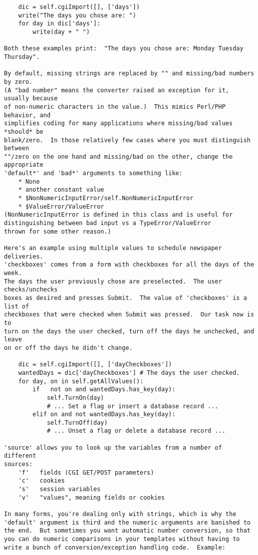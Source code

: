 \begin{verbatim}
    dic = self.cgiImport([], ['days'])
    write("The days you chose are: ")
    for day in dic['days']:
        write(day + " ")

Both these examples print:  "The days you chose are: Monday Tuesday Thursday".

By default, missing strings are replaced by "" and missing/bad numbers by zero.
(A "bad number" means the converter raised an exception for it, usually because
of non-numeric characters in the value.)  This mimics Perl/PHP behavior, and
simplifies coding for many applications where missing/bad values *should* be
blank/zero.  In those relatively few cases where you must distinguish between
""/zero on the one hand and missing/bad on the other, change the appropriate
'default*' and 'bad*' arguments to something like: 
    * None
    * another constant value
    * $NonNumericInputError/self.NonNumericInputError
    * $ValueError/ValueError
(NonNumericInputError is defined in this class and is useful for
distinguishing between bad input vs a TypeError/ValueError
thrown for some other reason.)

Here's an example using multiple values to schedule newspaper deliveries.
'checkboxes' comes from a form with checkboxes for all the days of the week.
The days the user previously chose are preselected.  The user checks/unchecks
boxes as desired and presses Submit.  The value of 'checkboxes' is a list of
checkboxes that were checked when Submit was pressed.  Our task now is to
turn on the days the user checked, turn off the days he unchecked, and leave
on or off the days he didn't change.

    dic = self.cgiImport([], ['dayCheckboxes'])
    wantedDays = dic['dayCheckboxes'] # The days the user checked.
    for day, on in self.getAllValues():
        if   not on and wantedDays.has_key(day):
            self.TurnOn(day)
            # ... Set a flag or insert a database record ...
        elif on and not wantedDays.has_key(day):
            self.TurnOff(day)
            # ... Unset a flag or delete a database record ...

'source' allows you to look up the variables from a number of different
sources:
    'f'   fields (CGI GET/POST parameters)
    'c'   cookies
    's'   session variables
    'v'   "values", meaning fields or cookies

In many forms, you're dealing only with strings, which is why the
'default' argument is third and the numeric arguments are banished to
the end.  But sometimes you want automatic number conversion, so that
you can do numeric comparisons in your templates without having to
write a bunch of conversion/exception handling code.  Example:


\end{verbatim}
